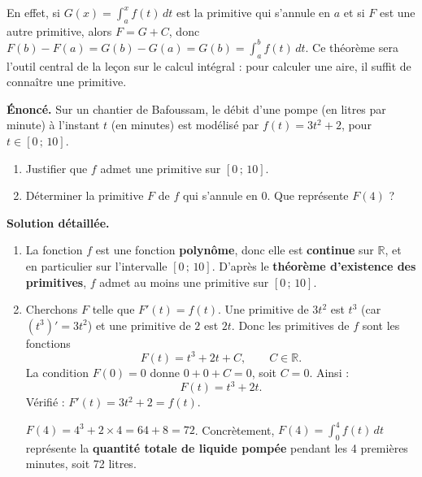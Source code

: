 \documentclass[11pt]{article}
\begin{document}
En effet, si $G(x) = \int_a^x f(t)\,dt$ est la primitive qui s'annule en $a$ et si $F$ est une autre primitive, alors $F = G + C$, donc $F(b) - F(a) = G(b) - G(a) = G(b) = \int_a^b f(t)\,dt$. Ce théorème sera l'outil central de la leçon sur le calcul intégral : pour calculer une aire, il suffit de connaître une primitive.

\begin{exoresolu}
\textbf{Énoncé.} Sur un chantier de Bafoussam, le débit d'une pompe (en litres par minute) à l'instant $t$ (en minutes) est modélisé par $f(t) = 3t^2 + 2$, pour $t \in [0\,;\,10]$.
\begin{enumerate}
\item Justifier que $f$ admet une primitive sur $[0\,;\,10]$.
\item Déterminer la primitive $F$ de $f$ qui s'annule en $0$. Que représente $F(4)$ ?
\end{enumerate}
\tcblower
\textbf{Solution détaillée.}
\begin{enumerate}
\item La fonction $f$ est une fonction \textbf{polynôme}, donc elle est \textbf{continue} sur $\mathbb{R}$, et en particulier sur l'intervalle $[0\,;\,10]$. D'après le \textbf{théorème d'existence des primitives}, $f$ admet au moins une primitive sur $[0\,;\,10]$.
\item Cherchons $F$ telle que $F'(t) = f(t)$. Une primitive de $3t^2$ est $t^3$ (car $(t^3)' = 3t^2$) et une primitive de $2$ est $2t$. Donc les primitives de $f$ sont les fonctions
\[ F(t) = t^3 + 2t + C, \qquad C \in \mathbb{R}. \]
La condition $F(0) = 0$ donne $0 + 0 + C = 0$, soit $C = 0$. Ainsi :
\[ F(t) = t^3 + 2t. \]
Vérifié : $F'(t) = 3t^2 + 2 = f(t)$.

$F(4) = 4^3 + 2 \times 4 = 64 + 8 = 72$. Concrètement, $F(4) = \displaystyle\int_0^4 f(t)\,dt$ représente la \textbf{quantité totale de liquide pompée} pendant les 4 premières minutes, soit 72 litres.
\end{enumerate}
\end{exoresolu}
\end{document}
